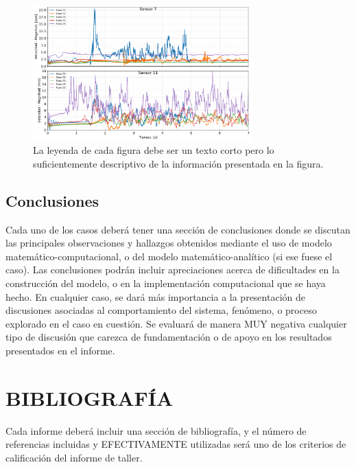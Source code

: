 \documentclass[11pt,stdletter,orderfromtodate,sigleft,twoside]{report}
\begin{document}
\begin{figure}[!hbt]
    \begin{center}
        \includegraphics[width=0.75\textwidth]{figures/flowVelocityPlot00.png}
    \end{center}
    \caption{La leyenda de cada figura debe ser un texto corto pero lo
    suficientemente descriptivo de la informaci\'on presentada en la
    figura.}\label{fig:figuraEjemplo00}
\end{figure}

\subsection{Conclusiones}
Cada uno de los casos deber\'a tener una secci\'on de conclusiones donde se
discutan las principales observaciones y hallazgos obtenidos mediante el uso de
modelo matem\'atico-computacional, o del modelo matem\'atico-anal\'itico (si
ese fuese el caso).  Las conclusiones podr\'an incluir apreciaciones acerca de
dificultades en la construcci\'on del modelo, o en la implementaci\'on
computacional que se haya hecho. En cualquier caso, se dar\'a m\'as importancia
a la presentaci\'on de discusiones asociadas al comportamiento del sistema,
fen\'omeno, o proceso explorado en el caso en cuesti\'on. Se evaluar\'a de
manera MUY negativa cualquier tipo de discusi\'on que carezca de
fundamentaci\'on o de apoyo en los resultados presentados en el informe.

\lipsum[1-2]

\section{BIBLIOGRAFÍA}
Cada informe deber\'a incluir una secci\'on de bibliograf\'ia, y el n\'umero de
referencias incluidas y EFECTIVAMENTE utilizadas ser\'a uno de los criterios de
calificaci\'on del informe de taller.
\end{document}
